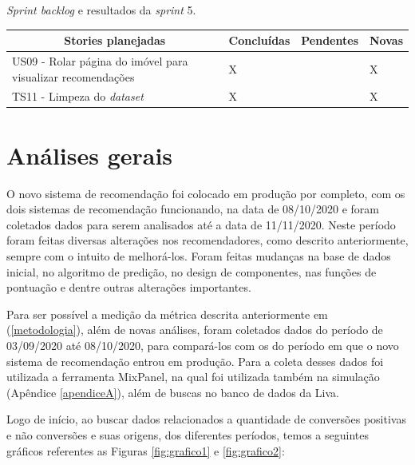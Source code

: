 \begin{quadro}[H]
\centering
\caption[\textit{Sprint backlog} e resultados da \textit{sprint} 5]{\textit{Sprint backlog} e resultados da \textit{sprint} 5.}
\label{quadro:sprint5}
\begin{tabular}{|p{6cm}|p{2cm}|p{2cm}|p{1cm}|}
\hline
\multicolumn{1}{|c|}{\textbf{Stories planejadas}} & \multicolumn{1}{c|}{\textbf{Concluídas}} & \multicolumn{1}{c|}{\textbf{Pendentes}} & \multicolumn{1}{c|}{\textbf{Novas}} \\ \hline
US09 - Rolar página do imóvel para visualizar recomendações & X &  & X \\ \hline
TS11 - Limpeza do \textit{dataset} & X &  & X \\ \hline
\end{tabular}
\end{quadro}

\section{Análises gerais}
\label{analise_gerais}

O novo sistema de recomendação foi colocado em produção por completo, com os dois sistemas de recomendação funcionando, na data de 08/10/2020 e foram coletados dados para serem analisados até a data de 11/11/2020. Neste período foram feitas diversas alterações nos recomendadores, como descrito anteriormente, sempre com o intuito de melhorá-los. Foram feitas mudanças na base de dados inicial, no algoritmo de predição, no design de componentes, nas funções de pontuação e dentre outras alterações importantes.

Para ser possível a medição da métrica descrita anteriormente em (\ref{metodologia}), além de novas análises, foram coletados dados do período de 03/09/2020 até 08/10/2020, para compará-los com os do período em que o novo sistema de recomendação entrou em produção. Para a coleta desses dados foi utilizada a ferramenta MixPanel, na qual foi utilizada também na simulação (Apêndice \ref{apendiceA}), além de buscas no banco de dados da Liva.

Logo de início, ao buscar dados relacionados a quantidade de conversões positivas e não conversões e suas origens, dos diferentes períodos, temos a seguintes gráficos referentes as Figuras \ref{fig:grafico1} e \ref{fig:grafico2}:

